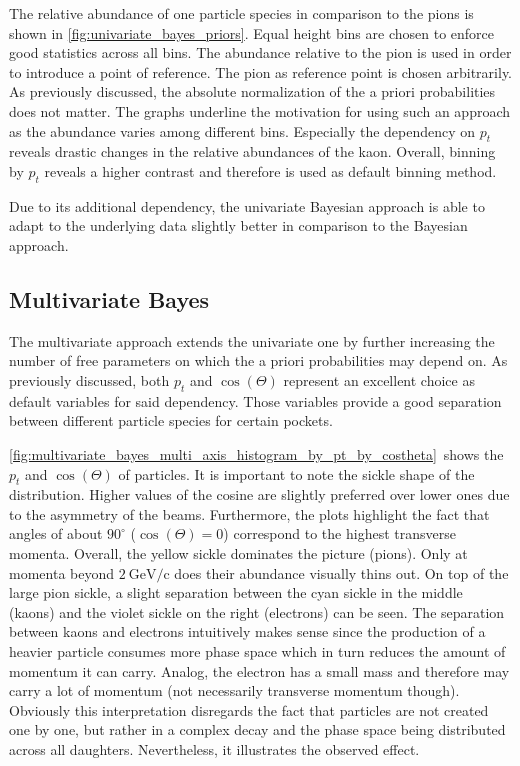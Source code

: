 The relative abundance of one particle species in comparison to the pions is shown in \autoref{fig:univariate_bayes_priors}. Equal height bins are chosen to enforce good statistics across all bins. The abundance relative to the pion is used in order to introduce a point of reference. The pion as reference point is chosen arbitrarily. As previously discussed, the absolute normalization of the a priori probabilities does not matter. The graphs underline the motivation for using such an approach as the abundance varies among different bins. Especially the dependency on $p_t$ reveals drastic changes in the relative abundances of the kaon. Overall, binning by $p_t$ reveals a higher contrast and therefore is used as default binning method.

Due to its additional dependency, the univariate Bayesian approach is able to adapt to the underlying data slightly better in comparison to the Bayesian approach.

\subsection{Multivariate Bayes}
\label{sec:bayesian_approach_multivariate_bayes}

The multivariate approach extends the univariate one by further increasing the number of free parameters on which the a priori probabilities may depend on. As previously discussed, both $p_t$ and $\cos(\Theta)$ represent an excellent choice as default variables for said dependency. Those variables provide a good separation between different particle species for certain pockets.

\autoref{fig:multivariate_bayes_multi_axis_histogram_by_pt_by_costheta}~shows the $p_t$ and $\cos(\Theta)$ of particles. It is important to note the sickle shape of the distribution. Higher values of the cosine are slightly preferred over lower ones due to the asymmetry of the beams. Furthermore, the plots highlight the fact that angles of about $90^{\circ}$ ($\cos(\Theta) = 0$) correspond to the highest transverse momenta. Overall, the yellow sickle dominates the picture (pions). Only at momenta beyond $2 \mathrm{~GeV/c}$ does their abundance visually thins out. On top of the large pion sickle, a slight separation between the cyan sickle in the middle (kaons) and the violet sickle on the right (electrons) can be seen. The separation between kaons and electrons intuitively makes sense since the production of a heavier particle\footnotemark{} consumes more phase space which in turn reduces the amount of momentum it can carry. Analog, the electron has a small mass and therefore may carry a lot of momentum (not necessarily transverse momentum though). Obviously this interpretation disregards the fact that particles are not created one by one, but rather in a complex decay and the phase space being distributed across all daughters. Nevertheless, it illustrates the observed effect.


